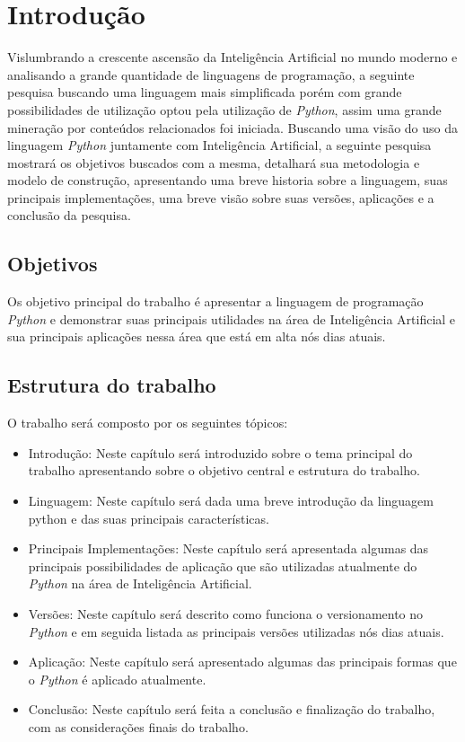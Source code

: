 

\chapter*{Introdução}

Vislumbrando a crescente ascensão da Inteligência Artificial no mundo moderno e analisando a grande quantidade de linguagens de programação, a seguinte pesquisa buscando uma linguagem mais simplificada porém com grande possibilidades de utilização optou pela utilização de \textit{Python}, assim uma grande mineração por conteúdos relacionados foi iniciada.\newline
Buscando uma visão do uso da linguagem \textit{Python} juntamente com Inteligência Artificial, a seguinte pesquisa mostrará os objetivos buscados com a mesma, detalhará sua metodologia e modelo de construção, apresentando uma breve historia sobre a linguagem, suas principais implementações, uma breve visão sobre suas versões, aplicações e a conclusão da pesquisa.

\newpage
\section{Objetivos}
Os objetivo principal do trabalho é apresentar a linguagem de programação \textit{Python} e demonstrar suas principais utilidades na área de Inteligência Artificial e sua principais aplicações nessa área que está em alta nós dias atuais.

\section{Estrutura do trabalho}
O trabalho será composto por os seguintes tópicos:
\begin{itemize}
   \item {Introdução}: Neste capítulo será introduzido sobre o tema principal do trabalho apresentando sobre o objetivo central e estrutura do trabalho.
   \item {Linguagem}: Neste capítulo será dada uma breve introdução da linguagem python e das suas principais características.
   \item {Principais Implementações}: Neste capítulo será apresentada algumas das principais possibilidades de aplicação que são utilizadas atualmente do \textit{Python} na área de Inteligência Artificial.
   \item {Versões}: Neste capítulo será descrito como funciona o versionamento no \textit{Python} e em seguida listada as principais versões utilizadas nós dias atuais.
   \item {Aplicação}: Neste capítulo será apresentado algumas das principais formas que o \textit{Python} é aplicado atualmente.
   \item {Conclusão}: Neste capítulo será feita a conclusão e finalização do trabalho, com as considerações finais do trabalho.
\end{itemize}
